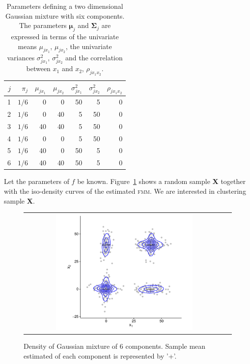 \documentclass[submit]{smj}
\theoremstyle{definition}
\newcommand{\m}[1]{\boldsymbol{#1}}
\newcommand{\fmm}{\textsc{fmm}\xspace}
\begin{document}
\begin{table}[t]
\centering
\begin{tabular}{rrrrrrr}
  \hline
$j$ & $\pi_j$ & $\mu_{j x_1}$ & $\mu_{j x_2}$ & $\sigma^2_{j x_1}$ & $\sigma^2_{j x_2}$ & $\rho_{j x_1 x_2}$ \\ 
  \hline
  1 &  $1/6$ &     0 &     0 &    50 &     5 &     0 \\ 
  2 &  $1/6$  &     0 &    40 &     5 &    50 &     0 \\ 
  3 &  $1/6$  &    40 &    40 &     5 &    50 &     0 \\ 
  4 &  $1/6$  &     0 &     0 &     5 &    50 &     0 \\ 
  5 &  $1/6$  &    40 &     0 &    50 &     5 &     0 \\ 
  6 &  $1/6$  &    40 &    40 &    50 &     5 &     0 \\ 
   \hline
\end{tabular}
\caption{Parameters defining a two dimensional Gaussian mixture with six components. The parameters $\m\mu_j$ and $\m\Sigma_j$ are expressed in terms of the univariate means $\mu_{j x_1}$, $\mu_{j x_2}$, the univariate variances $\sigma^2_{j x_1}$, $\sigma^2_{j x_2}$ and the correlation between $x_1$ and $x_2$, $\rho_{j x_1 x_2}$.}
\label{pars_table}
\end{table}


Let the parameters of $f$ be known. Figure~\ref{ex_mixture} shows a random sample \textbf{X} together with the iso-density curves of the estimated \fmm. We are interested in clustering sample \textbf{X}.

\begin{figure}[thbp]
\begin{center}
\begin{tabular}{cc}
  \includegraphics[width=0.7\textwidth]{figures/partition-example-mixture.pdf} \\
 \end{tabular}
 \caption{Density of Gaussian mixture of 6 components. Sample mean estimated of each component is represented by '+'.}\label{ex_mixture}
\end{center}
\end{figure}
\end{document}
